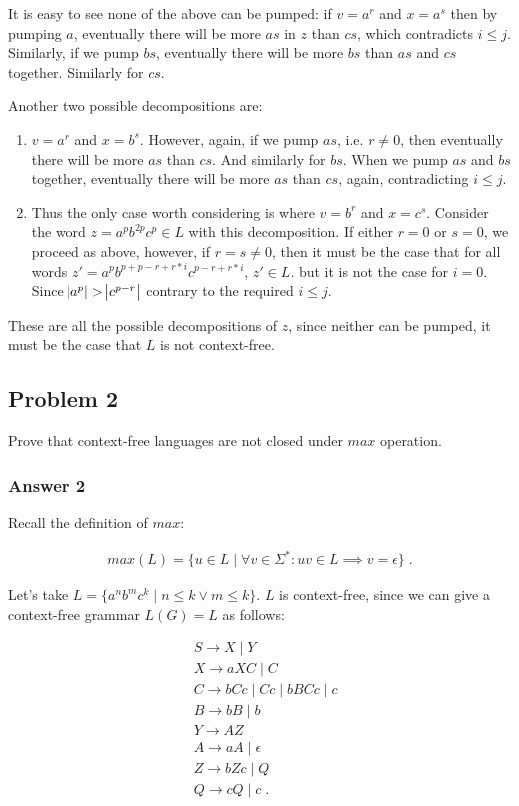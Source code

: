 \documentclass[11pt]{article}
\begin{document}
It is easy to see none of the above can be pumped: if $v = a^r$ and $x =
    a^s$ then by pumping $a$, eventually there will be more $as$ in $z$ than
$cs$, which contradicts $i \leq j$.  Similarly, if we pump $bs$, eventually
there will be more $bs$ than $as$ and $cs$ together.  Similarly for $cs$.

Another two possible decompositions are:
\begin{enumerate}
\item $v = a^r$ and $x = b^s$.  However, again, if we pump $as$, i.e. $r \neq
       0$, then eventually there will be more $as$ than $cs$.  And similarly for
$bs$.  When we pump $as$ and $bs$ together, eventually there will be more
$as$ than $cs$, again, contradicting $i \leq j$.
\item Thus the only case worth considering is where $v = b^r$ and $x = c^s$.
Consider the word $z = a^pb^{2p}c^p \in L$ with this decomposition.  If
either $r = 0$ or $s = 0$, we proceed as above, however, if $r = s \neq
       0$, then it must be the case that for all words $z' =
       a^pb^{p+p-r+r*i}c^{p-r+r*i}$, $z' \in L$. but it is not the case for
$i=0$.  Since $\abs{a^p} > \abs{c^{p-r}}$ contrary to the required $i
       \leq j$.
\end{enumerate}


These are all the possible decompositions of $z$, since neither can be
pumped, it must be the case that $L$ is not context-free.

\subsection{Problem 2}
\label{sec-1-2}
Prove that context-free languages are not closed under $max$ operation.

\subsubsection{Answer 2}
\label{sec-1-2-1}
Recall the definition of $max$:

\begin{align*}
  max(L) = \{u \in L \;|\; \forall v \in \Sigma^*: uv \in L \implies v = \epsilon\} \;.
\end{align*}

Let's take $L = \{a^nb^mc^k \;|\; n \leq k \lor m \leq k\}$.  $L$ is context-free,
since we can give a context-free grammar $L(G) = L$ as follows:

\begin{align*}
  &S \to X \;|\; Y \\
  &X \to aXC \;|\; C \\
  &C \to bCc \;|\; Cc \;|\; bBCc \;|\; c \\
  &B \to bB \;|\; b \\
  &Y \to AZ \\
  &A \to aA \;|\; \epsilon \\
  &Z \to bZc \;|\; Q \\
  &Q \to cQ \;|\; c \;.
\end{align*}
\end{document}
